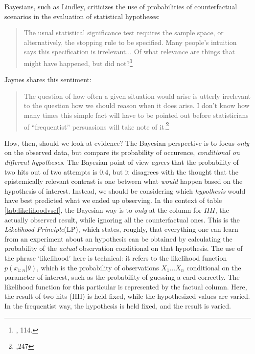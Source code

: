 Bayesians, such as Lindley, criticizes the use of probabilities of counterfactual scenarios in the evaluation of statistical hypotheses:


\begin{quote}
The usual statistical significance test requires the sample space, or alternatively, the stopping rule to be specified. Many people's intuition says this specification is irrelevant... Of what relevance are things that might have happened, but did not?\footnote{\cite{lindleybern}, 114.}
\end{quote}

Jaynes shares this sentiment:

\begin{quote}
The question of how often a given situation would arise is utterly
irrelevant to the question how we should reason when it does arise. I
don't know how many times this simple fact will have to be pointed out
before statisticians of ``frequentist'' persuasions will take note of
it.\footnote{\cite{jaynesmight},247}
\end{quote}

How, then, should we look at evidence? The Bayesian perspective is to focus \emph{only} on the observed data, but compare its probability of occurence, \emph{conditional on different hypotheses}. The Bayesian point of view \emph{agrees} that the probability of two hits out of two attempts is $0.4$, but it disagrees with the thought that the epistemically relevant contrast is one between what \emph{would} happen based on the hypothesis of interest. Instead, we should be considering which \emph{hypothesis} would have best predicted what we ended up observing. In the context of table \ref{tab:likelihoodvscf}, the Bayesian way is to \emph{only} at the column for $HH$, the actually observed result, while ignoring all the counterfactual ones. This is the \emph{Likelihood Principle}(LP), which states, roughly, that everything one can learn from
an experiment about an hypothesis can be obtained by calculating the
probability of the \emph{actual} observation conditional on that
hypothesis. The use of the phrase `likelihood' here is technical: it refers to the likelihood function \(p(x_{1:n}|\theta)\), which is the probability of
observations \(X_1...X_n\) conditional on the parameter of interest,
such as the probability of guessing a card correctly. The likelihood function for this particular is represented by the factual column. Here, the result of two hits (HH) is held fixed, while the hypothesized values are varied. In the frequentist way, the hypothesis is held fixed, and the result is varied.


